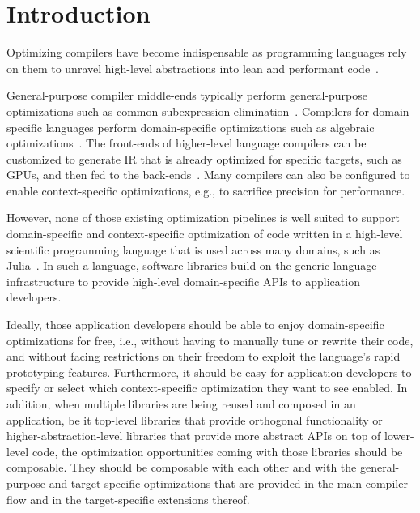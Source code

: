 \section{Introduction}
Optimizing compilers have become indispensable as programming languages rely on them to unravel high-level abstractions into lean and performant code~\cite{lattnerMLIRCompilerInfrastructure2020,hosteColeCompilerOptimization2008,lattnerLLVMCompilationFramework2004}.

General-purpose compiler middle-ends typically perform general-purpose optimizations such as common subexpression elimination~\cite{10.5555/286076}. Compilers for domain-specific languages perform domain-specific optimizations such as algebraic optimizations~\cite{chrislattnerMLIRScalingCompiler2021,10.5555/286076}. The front-ends of higher-level language compilers can be customized to generate IR that is already optimized for specific targets, such as GPUs, and then fed to the back-ends~\cite{besardEffectiveExtensibleProgramming2019}. Many compilers can also be configured to enable context-specific optimizations, e.g., to sacrifice precision for performance.  

However, none of those existing optimization pipelines is well suited to support domain-specific and context-specific optimization of code written in a high-level scientific programming language that is used across many domains, such as Julia~\cite{bezansonJuliaFastDynamic2012}.
In such a language, software libraries build on the generic language infrastructure to provide high-level domain-specific APIs to application developers. 

Ideally, those application developers should be able to enjoy domain-specific optimizations for free, i.e., without having to manually tune or rewrite their code, and without facing restrictions on their freedom to exploit the language's rapid prototyping features. Furthermore, it should be easy for application developers to specify or select which context-specific optimization they want to see enabled. In addition, when multiple libraries are being reused and composed in an application, be it top-level libraries that provide orthogonal functionality or higher-abstraction-level libraries that provide more abstract APIs on top of lower-level code, the optimization opportunities coming with those libraries should be composable. They should be composable with each other and with the general-purpose and target-specific optimizations that are provided in the main compiler flow and in the target-specific extensions thereof. 

